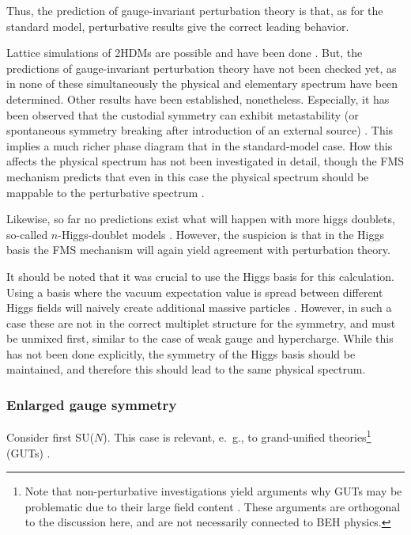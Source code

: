 \documentclass[final,12pt,3p,longtitle]{elsarticle}
\newcommand*{\1}{1\!\!\!\bot}
\begin{document}
Thus, the prediction of gauge-invariant perturbation theory is that, as for the standard model, perturbative results give the correct leading behavior.

Lattice simulations of 2HDMs are possible and have been done \cite{Wurtz:2009gf,Lewis:2010ps,Maas:2014nya}. But, the predictions of gauge-invariant perturbation theory have not been checked yet, as in none of these simultaneously the physical and elementary spectrum have been determined. Other results have been established, nonetheless. Especially, it has been observed that the custodial symmetry can exhibit metastability (or spontaneous symmetry breaking after introduction of an external source) \cite{Wurtz:2009gf,Lewis:2010ps}. This implies a much richer phase diagram that in the standard-model case. How this affects the physical spectrum has not been investigated in detail, though the FMS mechanism predicts that even in this case the physical spectrum should be mappable to the perturbative spectrum \cite{Maas:2016qpu}.

Likewise, so far no predictions exist what will happen with more higgs doublets, so-called $n$-Higgs-doublet models \cite{Ivanov:2017dad}. However, the suspicion is that in the Higgs basis the FMS mechanism will again yield agreement with perturbation theory.

It should be noted that it was crucial to use the Higgs basis for this calculation. Using a basis where the vacuum expectation value is spread between different Higgs fields will naively create additional massive particles \cite{Maas:2015gma}. However, in such a case these are not in the correct multiplet structure for the symmetry, and must be unmixed first, similar to the case of weak gauge and hypercharge. While this has not been done explicitly, the symmetry of the Higgs basis should be maintained, and therefore this should lead to the same physical spectrum.

\subsubsection{Enlarged gauge symmetry}\label{sss:gut}

Consider first SU($N$). This case is relevant, e.\ g., to grand-unified theories\footnote{Note that non-perturbative investigations yield arguments why GUTs may be problematic due to their large field content \cite{Llanes-Estrada:2017zws,Shaposhnikov:2009pv,Dona:2013qba,Eichhorn:2016esv,Litim:2011qf}. These arguments are orthogonal to the discussion here, and are not necessarily connected to BEH physics.} (GUTs) \cite{Bohm:2001yx,Langacker:1980js}.
\end{document}
